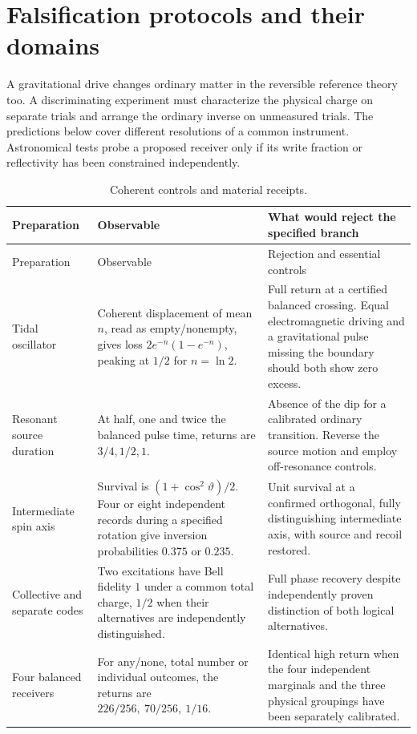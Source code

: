 \section{Falsification protocols and their domains}
A gravitational drive changes ordinary matter in the reversible reference theory too. A discriminating experiment must characterize the physical charge on separate trials and arrange the ordinary inverse on unmeasured trials. The predictions below cover different resolutions of a common instrument. Astronomical tests probe a proposed receiver only if its write fraction or reflectivity has been constrained independently.
\small\setlength{\LTpre}{5pt}\setlength{\LTpost}{7pt}
\begin{longtable}{@{}L{.215\linewidth}L{.36\linewidth}L{.36\linewidth}@{}}
\caption{Coherent controls and material receipts.}\\
\toprule Preparation & Observable & What would reject the specified branch\\\midrule\endfirsthead
\toprule Preparation & Observable & Rejection and essential controls\\\midrule\endhead
Tidal oscillator & Coherent displacement of mean \(n\), read as empty/nonempty, gives loss \(2e^{-n}(1-e^{-n})\), peaking at \(1/2\) for \(n=\ln2\). & Full return at a certified balanced crossing. Equal electromagnetic driving and a gravitational pulse missing the boundary should both show zero excess.\\[3pt]
Resonant source duration & At half, one and twice the balanced pulse time, returns are \(3/4,1/2,1\). & Absence of the dip for a calibrated ordinary transition. Reverse the source motion and employ off-resonance controls.\\[3pt]
Intermediate spin axis & Survival is \((1+\cos^2\vartheta)/2\). Four or eight independent records during a specified rotation give inversion probabilities \(0.375\) or \(0.235\). & Unit survival at a confirmed orthogonal, fully distinguishing intermediate axis, with source and recoil restored.\\[3pt]
Collective and separate codes & Two excitations have Bell fidelity \(1\) under a common total charge, \(1/2\) when their alternatives are independently distinguished. & Full phase recovery despite independently proven distinction of both logical alternatives.\\[3pt]
Four balanced receivers & For any/none, total number or individual outcomes, the returns are \(226/256,\ 70/256,\ 1/16\). & Identical high return when the four independent marginals and the three physical groupings have been separately calibrated.\\[3pt]

\end{longtable}
